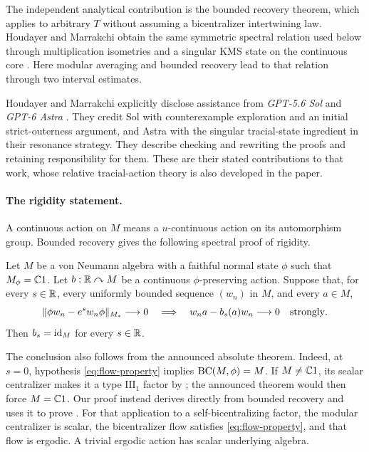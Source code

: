 The independent analytical contribution is the bounded recovery theorem, which applies
to arbitrary $T$ without assuming a bicentralizer intertwining law.
Houdayer and Marrakchi obtain the same symmetric spectral relation used
below through multiplication isometries and a singular KMS state on the
continuous core
\cite[Section~8.4, Propositions~8.8--8.10]{HoudayerMarrakchi2026}.
Here modular averaging and bounded recovery lead to that relation through
two interval estimates.

Houdayer and Marrakchi explicitly disclose assistance from
\emph{GPT-5.6 Sol} and \emph{GPT-6 Astra}
\cite[p.~7]{HoudayerMarrakchi2026}. They credit Sol with counterexample
exploration and an initial strict-outerness argument, and Astra with
the singular tracial-state ingredient in their resonance strategy.
They describe checking and rewriting the proofs and retaining
responsibility for them. These are their stated contributions to that
work, whose relative tracial-action theory is also developed in the paper.

\paragraph{The rigidity statement.}
A continuous action on $M$ means a $u$-continuous action on its
automorphism group. Bounded recovery gives the following spectral proof
of rigidity.

\begin{theorem}\label{thm:rigidity}
Let $M$ be a von Neumann algebra with a faithful normal state $\phi$ such
that $M_\phi=\mathbb C1$. Let $b:\mathbb R\curvearrowright M$ be a continuous
$\phi$-preserving action. Suppose that, for every $s\in\mathbb R$, every uniformly
bounded sequence $(w_n)$ in $M$, and every $a\in M$,
\begin{equation}\label{eq:flow-property}
  \lVert\phi w_n-e^s w_n\phi\rVert_{M_*}\longrightarrow0
  \quad\Longrightarrow\quad
  w_na-b_s(a)w_n\longrightarrow0
  \quad\text{strongly}.
\end{equation}
Then $b_s=\operatorname{id}_M$ for every $s\in\mathbb R$.
\end{theorem}

The conclusion also follows from the announced absolute theorem.
Indeed, at $s=0$, hypothesis \eqref{eq:flow-property} implies
$\operatorname{BC}(M,\phi)=M$. If $M\ne\mathbb C1$, its scalar centralizer makes it a
type $\mathrm{III}_1$ factor by
\cite[Lemma~2.1]{MarrakchiVaes2024}; the announced theorem would then
force $M=\mathbb C1$. Our proof instead derives  directly
from bounded recovery and uses it to prove .
For that application to a self-bicentralizing factor, the modular
centralizer is scalar, the bicentralizer flow satisfies
\eqref{eq:flow-property}, and that flow is ergodic. A trivial ergodic
action has scalar underlying algebra.

